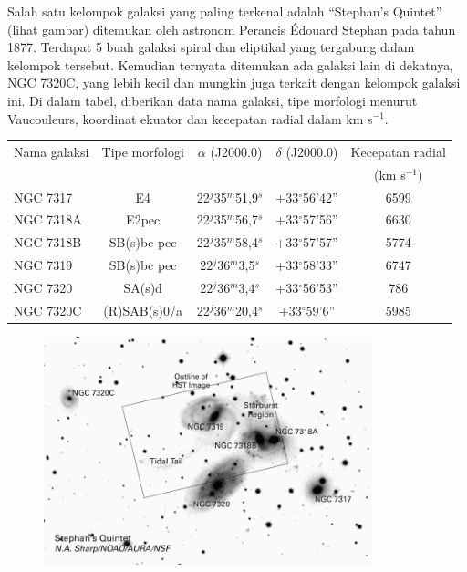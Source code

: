 \documentclass[11pt,fleqn]{exam}
\newcommand*{\kms}{km s\ensuremath{^{-1}}}
\newcommand*{\jam}{\ensuremath{^{j}}}
\newcommand*{\m}{\ensuremath{^{m}}}
\newcommand*{\s}{\ensuremath{^{s}}}
\newcommand*{\de}{\ensuremath{^{\circ}}}
\newcommand*{\am}{'}
\newcommand*{\as}{''}
\newcommand*{\alp}{\ensuremath{\alpha}}
\newcommand*{\del}{\ensuremath{\delta}}
\begin{document}
\begin{questions}
\vspace{0.5cm}
\question Salah satu kelompok galaksi yang paling terkenal adalah ``Stephan's Quintet'' (lihat gambar) ditemukan oleh astronom Perancis \'{E}douard Stephan pada tahun 1877. Terdapat 5 buah galaksi spiral dan eliptikal yang tergabung dalam kelompok tersebut. Kemudian ternyata ditemukan ada galaksi lain di dekatnya, NGC 7320C, yang lebih kecil dan mungkin juga terkait dengan kelompok galaksi ini. Di dalam tabel, diberikan data nama galaksi, tipe morfologi menurut Vaucouleurs, koordinat ekuator dan kecepatan radial dalam \kms.

\begin{table}[H]
\centering
\small
\begin{tabular}{|l|c|c|c|c|}
	\hline
	Nama galaksi & Tipe morfologi & \alp{} (J2000.0) & \del{} (J2000.0) & Kecepatan radial\\ 
	& & & & (\kms) \\
	\hline
	\hline
	NGC 7317 & E4 & 22\jam35\m51,9\s & +33\de56\am42\as & 6599 \\
	\hline
	NGC 7318A & E2pec & 22\jam35\m56,7\s & +33\de57\am56\as & 6630 \\
	\hline
	NGC 7318B & SB(s)bc pec & 22\jam35\m58,4\s & +33\de57\am57\as & 5774 \\
	\hline
	NGC 7319 & SB(s)bc pec & 22\jam36\m3,5\s & +33\de58\am33\as & 6747 \\
	\hline
	NGC 7320 & SA(s)d & 22\jam36\m3,4\s & +33\de56\am53\as & 786 \\
	\hline
	NGC 7320C & (R)SAB(s)0/a & 22\jam36\m20,4\s & +33\de59\am6\as & 5985 \\
	\hline
\end{tabular}
\end{table}

\begin{figure}[H]
	\centering
	\includegraphics[width=0.85\textwidth]{gugus_galaksi.png}
	\label{fig:diagramHR}
\end{figure}


\end{questions}
\end{document}
